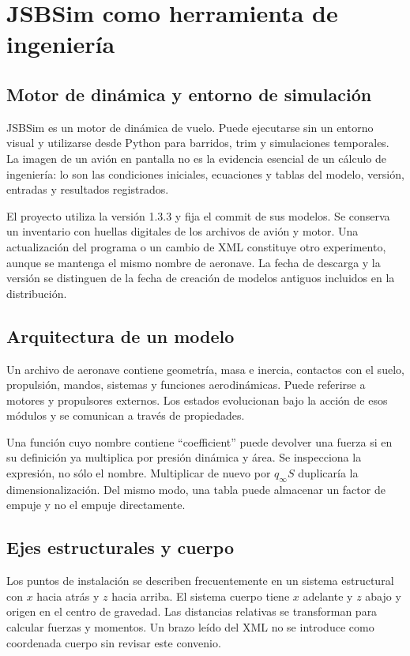 \chapter{JSBSim como herramienta de ingeniería}\label{ch:jsbsim}

\section{Motor de dinámica y entorno de simulación}
JSBSim es un motor de dinámica de vuelo. Puede ejecutarse sin un entorno visual y utilizarse desde Python para barridos, trim y simulaciones temporales. La imagen de un avión en pantalla no es la evidencia esencial de un cálculo de ingeniería: lo son las condiciones iniciales, ecuaciones y tablas del modelo, versión, entradas y resultados registrados.

El proyecto utiliza la versión 1.3.3 y fija el commit de sus modelos. Se conserva un inventario con huellas digitales de los archivos de avión y motor. Una actualización del programa o un cambio de XML constituye otro experimento, aunque se mantenga el mismo nombre de aeronave. La fecha de descarga y la versión se distinguen de la fecha de creación de modelos antiguos incluidos en la distribución.

\section{Arquitectura de un modelo}
Un archivo de aeronave contiene geometría, masa e inercia, contactos con el suelo, propulsión, mandos, sistemas y funciones aerodinámicas. Puede referirse a motores y propulsores externos. Los estados evolucionan bajo la acción de esos módulos y se comunican a través de propiedades.

Una función cuyo nombre contiene ``coefficient'' puede devolver una fuerza si en su definición ya multiplica por presión dinámica y área. Se inspecciona la expresión, no sólo el nombre. Multiplicar de nuevo por $q_\infty S$ duplicaría la dimensionalización. Del mismo modo, una tabla puede almacenar un factor de empuje y no el empuje directamente.

\section{Ejes estructurales y cuerpo}
Los puntos de instalación se describen frecuentemente en un sistema estructural con $x$ hacia atrás y $z$ hacia arriba. El sistema cuerpo tiene $x$ adelante y $z$ abajo y origen en el centro de gravedad. Las distancias relativas se transforman para calcular fuerzas y momentos. Un brazo leído del XML no se introduce como coordenada cuerpo sin revisar este convenio.

